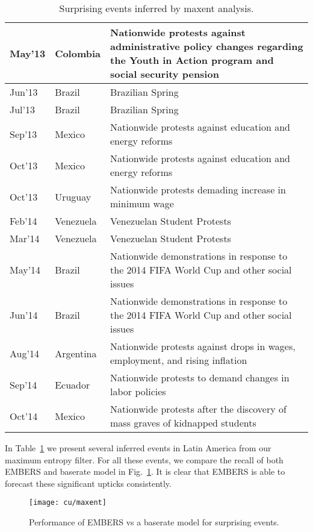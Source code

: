 \begin{table}
\caption{Surprising events inferred by maxent analysis.}
\renewcommand{\arraystretch}{1.1}
\vspace{-3mm}
 \centering
 \begin{tabular}{|l|l|m{6cm}|}
 \hline
May'13  &  Colombia	 &  Nationwide protests against administrative policy changes regarding the
Youth in Action program and social security pension \\ \hline
Jun'13  &  Brazil  &  Brazilian Spring \\ \hline
Jul'13  &  Brazil  &  Brazilian Spring \\ \hline
Sep'13  &  Mexico  &  Nationwide protests against education and energy reforms \\ \hline
Oct'13  &  Mexico  &  Nationwide protests against education and energy reforms \\ \hline
Oct'13  &  Uruguay  &  Nationwide protests demading increase in minimum wage \\ \hline
Feb'14  &  Venezuela	  &  Venezuelan Student Protests \\ \hline
Mar'14  &  Venezuela  &  	Venezuelan Student Protests \\ \hline
May'14  &  Brazil  &  Nationwide demonstrations in response to the 2014 FIFA World Cup and other social issues \\ \hline
Jun'14  &  Brazil  &  Nationwide demonstrations in response to the 2014 FIFA World Cup and other social issues \\ \hline
Aug'14  &  Argentina	  &  Nationwide protests against drops in wages, employment, and rising inflation \\ \hline
Sep'14  &  Ecuador  &  Nationwide protests to demand changes in labor policies \\ \hline
Oct'14  &  Mexico  &  Nationwide protests after the discovery of mass graves of kidnapped students  \\ \hline
\end{tabular}
\vspace{-5mm}
\label{tab:maxentEvents}
\end{table}

In Table~\ref{tab:maxentEvents} we present several inferred events in Latin America from our maximum entropy
filter.
For all these events, we compare the recall of both EMBERS and baserate model in Fig.~\ref{fig:maxent}. 
It is clear that EMBERS is able to forecast these significant upticks consistently.

\begin{figure}[H]
\centering
\texttt{[image: cu/maxent]}
\caption{Performance of EMBERS vs a baserate model for surprising events.}
\label{fig:maxent}
\end{figure}
